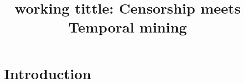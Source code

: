 \documentclass[11pt]{article}
\title{\vspace{-0.65in}working tittle: {\LARGE Censorship meets Temporal mining}}
\date{}
\renewcommand{\baselinestretch}{0.90}
\begin{document}
\maketitle
\vspace{-1cm}
\smallskip

\thispagestyle{empty}
\newpage

%


\setcounter{page}{1}



%
%
%



\section{Introduction} \label{sec:motivation}





%
%

%
%
%
%
%
%
%
%
%

%
%
%


%
%
%
%
%
%
\end{document}
